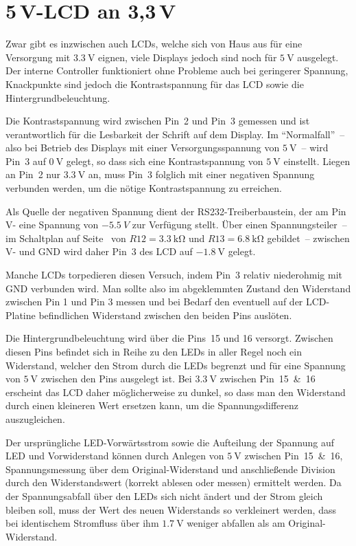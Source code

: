 \documentclass[paper=a4, parskip, numbers=noenddot, toc=listof, headsepline]{scrbook}
\begin{document}
			\section[5V-LCD an 3,3V]{5\,V-LCD an 3,3\,V}

				Zwar gibt es inzwischen auch LCDs, welche sich von Haus aus für eine Versorgung mit $\SI{3,3}{\volt}$ eignen, viele Displays jedoch sind noch für $\SI{5}{\volt}$ ausgelegt. Der interne Controller funktioniert ohne Probleme auch bei geringerer Spannung, Knackpunkte sind jedoch die Kontrastspannung für das LCD sowie die Hintergrundbeleuchtung.

				Die Kontrastspannung wird zwischen Pin~2 und Pin~3 gemessen und ist verantwortlich für die Lesbarkeit der Schrift auf dem Display. Im \enquote{Normalfall}~-- also bei Betrieb des Displays mit einer Versorgungsspannung von $\SI{5}{\volt}$~-- wird Pin~3 auf $\SI{0}{\volt}$ gelegt, so dass sich eine Kontrastspannung von $\SI{5}{\volt}$ einstellt. Liegen an Pin~2 nur $\SI{3,3}{\volt}$ an, muss Pin~3 folglich mit einer negativen Spannung verbunden werden, um die nötige Kontrastspannung zu erreichen.

				Als Quelle der negativen Spannung dient der RS232-Treiberbaustein, der am Pin V- eine Spannung von $\SI{-5,5}{V}$ zur Verfügung stellt. Über einen Spannungsteiler~-- im Schaltplan auf Seite~\pageref{fig:transmitterschematic} von $R12 = \SI{3,3}{\kilo\ohm}$ und $R13 = \SI{6,8}{\kilo\ohm}$ gebildet~-- zwischen V- und GND wird daher Pin~3 des LCD auf $\SI{-1,8}{\volt}$ gelegt.

				Manche LCDs torpedieren diesen Versuch, indem Pin~3 relativ niederohmig mit GND verbunden wird. Man sollte also im abgeklemmten Zustand den Widerstand zwischen Pin 1 und Pin 3 messen und bei Bedarf den eventuell auf der LCD-Platine befindlichen Widerstand zwischen den beiden Pins auslöten.

				Die Hintergrundbeleuchtung wird über die Pins~15 und 16 versorgt. Zwischen diesen Pins befindet sich in Reihe zu den LEDs in aller Regel noch ein Widerstand, welcher den Strom durch die LEDs begrenzt und für eine Spannung von $\SI{5}{\volt}$ zwischen den Pins ausgelegt ist. Bei $\SI{3,3}{\volt}$ zwischen Pin~15~\&~16 erscheint das LCD daher möglicherweise zu dunkel, so dass man den Widerstand durch einen kleineren Wert ersetzen kann, um die Spannungsdifferenz auszugleichen.

				Der ursprüngliche LED-Vorwärtsstrom sowie die Aufteilung der Spannung auf LED und Vorwiderstand können durch Anlegen von $\SI{5}{\volt}$ zwischen Pin~15~\&~16, Spannungsmessung über dem Original-Widerstand und anschließende Division durch den Widerstandswert (korrekt ablesen oder messen) ermittelt werden. Da der Spannungsabfall über den LEDs sich nicht ändert und der Strom gleich bleiben soll, muss der Wert des neuen Widerstands so verkleinert werden, dass bei identischem Stromfluss über ihm $\SI{1,7}{\volt}$ weniger abfallen als am Original-Widerstand.
\end{document}
